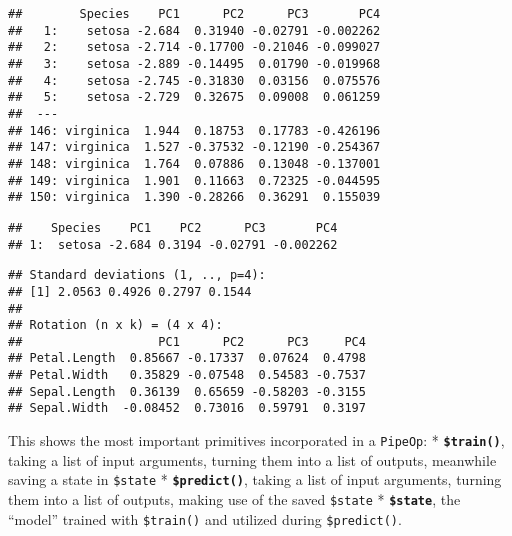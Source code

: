 \documentclass[
]{scrbook}
\newenvironment{Shaded}{\begin{snugshade}}{\end{snugshade}}
\newcommand{\DecValTok}[1]{\textcolor[rgb]{0.00,0.00,0.81}{#1}}
\newcommand{\FunctionTok}[1]{\textcolor[rgb]{0.00,0.00,0.00}{#1}}
\newcommand{\NormalTok}[1]{#1}
\newcommand{\OtherTok}[1]{\textcolor[rgb]{0.56,0.35,0.01}{#1}}
\newcommand{\SpecialCharTok}[1]{\textcolor[rgb]{0.00,0.00,0.00}{#1}}
\renewenvironment{Shaded} {\begin{snugshade}\small} {\end{snugshade}}
\begin{document}
\begin{verbatim}
##        Species    PC1      PC2      PC3       PC4
##   1:    setosa -2.684  0.31940 -0.02791 -0.002262
##   2:    setosa -2.714 -0.17700 -0.21046 -0.099027
##   3:    setosa -2.889 -0.14495  0.01790 -0.019968
##   4:    setosa -2.745 -0.31830  0.03156  0.075576
##   5:    setosa -2.729  0.32675  0.09008  0.061259
##  ---                                             
## 146: virginica  1.944  0.18753  0.17783 -0.426196
## 147: virginica  1.527 -0.37532 -0.12190 -0.254367
## 148: virginica  1.764  0.07886  0.13048 -0.137001
## 149: virginica  1.901  0.11663  0.72325 -0.044595
## 150: virginica  1.390 -0.28266  0.36291  0.155039
\end{verbatim}

\begin{Shaded}
\end{Shaded}

\begin{verbatim}
##    Species    PC1    PC2      PC3       PC4
## 1:  setosa -2.684 0.3194 -0.02791 -0.002262
\end{verbatim}

\begin{Shaded}
\end{Shaded}

\begin{verbatim}
## Standard deviations (1, .., p=4):
## [1] 2.0563 0.4926 0.2797 0.1544
## 
## Rotation (n x k) = (4 x 4):
##                   PC1      PC2      PC3     PC4
## Petal.Length  0.85667 -0.17337  0.07624  0.4798
## Petal.Width   0.35829 -0.07548  0.54583 -0.7537
## Sepal.Length  0.36139  0.65659 -0.58203 -0.3155
## Sepal.Width  -0.08452  0.73016  0.59791  0.3197
\end{verbatim}

This shows the most important primitives incorporated in a \texttt{PipeOp}:
* \textbf{\texttt{\$train()}}, taking a list of input arguments, turning them into a list of outputs, meanwhile saving a state in \texttt{\$state}
* \textbf{\texttt{\$predict()}}, taking a list of input arguments, turning them into a list of outputs, making use of the saved \texttt{\$state}
* \textbf{\texttt{\$state}}, the ``model'' trained with \texttt{\$train()} and utilized during \texttt{\$predict()}.
\end{document}
